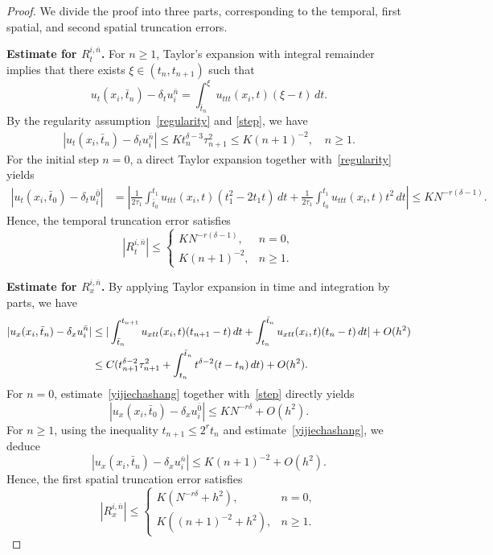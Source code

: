 \documentclass[10pt, reqno]{amsart}
\theoremstyle{remark}
\theoremstyle{definition}
\numberwithin{table}{section}
\begin{document}
\begin{proof}
We divide the proof into three parts, corresponding to the temporal, first spatial, and second spatial truncation errors.

\medskip
\noindent\textbf{Estimate for $R_t^{i,\bar n}$.}
For $n \ge 1$, Taylor’s expansion with integral remainder implies that there exists $\xi \in (t_n, t_{n+1})$ such that
\[
u_t(x_i,\bar{t}_n) - \delta_t u_i^{\bar{n}}
= \int_{\bar{t}_n}^{\xi} u_{ttt}(x_i,t) (\xi - t) \, dt.
\]
By the regularity assumption~\eqref{regularity} and \eqref{step}, we have
\begin{align*}
|u_t(x_i,\bar{t}_n) - \delta_t u_i^{\bar{n}}|
\le K t_n^{\delta-3} \tau_{n+1}^2
\le K (n+1)^{-2}, \quad n \ge 1.
\end{align*}
For the initial step $n=0$, a direct Taylor expansion together with~\eqref{regularity} yields
\begin{align*}
|u_t(x_i,\bar{t}_0) - \delta_t u_i^{\bar{0}}|
&= | \frac{1}{2\tau_1} \int_{\bar{t}_0}^{t_1} u_{ttt}(x_i,t)(t_1^2 - 2t_1 t) \, dt
      + \frac{1}{2\tau_1} \int_{t_0}^{t_1} u_{ttt}(x_i,t) t^2 \, dt | \le K N^{-r(\delta-1)}.
\end{align*}
Hence, the temporal truncation error satisfies
\[
|R_t^{i,\bar{n}}|
\le
\begin{cases}
K N^{-r(\delta-1)}, & n=0, \\
K (n+1)^{-2}, & n \ge 1.
\end{cases}
\]

\medskip
\noindent\textbf{Estimate for $R_x^{i,\bar{n}}$.}
By applying Taylor expansion in time and integration by parts, we have
\begin{align}
|u_x(x_i,\bar{t}_n) - \delta_x u_i^{\bar{n}}|
&\le
| \int_{\bar{t}_n}^{t_{n+1}} u_{xtt}(x_i,t)(t_{n+1}-t)\,dt
+ \int_{t_n}^{\bar{t}_n} u_{xtt}(x_i,t)(t_n - t)\,dt |
+ O(h^2) \notag \\
&\le C ( t_{n+1}^{\delta-2} \tau_{n+1}^2
+ \int_{t_n}^{\bar{t}_n} t^{\delta-2}(t-t_n)\,dt ) + O(h^2). \label{yijiechashang}
\end{align}
For $n=0$, estimate~\eqref{yijiechashang} together with~\eqref{step} directly yields
\[
|u_x(x_i,\bar{t}_0) - \delta_x u_i^{\bar{0}}|
\le K N^{-r\delta} + O(h^2).
\]
For $n \ge 1$, using the inequality $t_{n+1} \le 2^r t_n$ and estimate~\eqref{yijiechashang}, we deduce
\[
|u_x(x_i,\bar{t}_n) - \delta_x u_i^{\bar{n}}|
\le K (n+1)^{-2} + O(h^2).
\]
Hence, the first spatial truncation error satisfies
\[
|R_x^{i,\bar{n}}|
\le
\begin{cases}
K (N^{-r\delta} + h^2), & n=0, \\
K ((n+1)^{-2} + h^2), & n \ge 1.
\end{cases}
\]


\end{proof}
\end{document}
